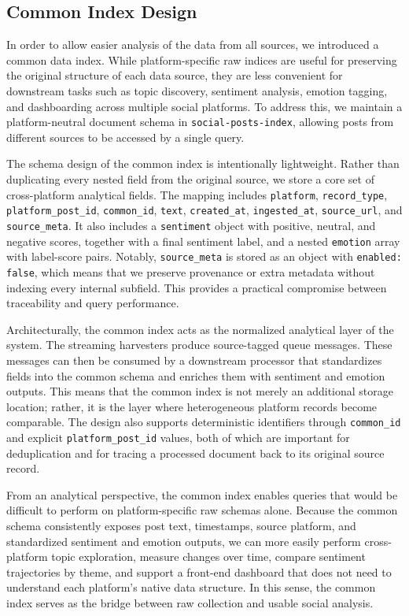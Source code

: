 \subsection{Common Index Design}
\label{DataProcessingCommonIndexDesign}
In order to allow easier analysis of the data from all sources, we introduced a common data index. While platform-specific raw indices are useful for preserving the original structure of each data source, they are less convenient for downstream tasks such as topic discovery, sentiment analysis, emotion tagging, and dashboarding across multiple social platforms. To address this, we maintain a platform-neutral document schema in \texttt{social-posts-index}, allowing posts from different sources to be accessed by a single query.

The schema design of the common index is intentionally lightweight. Rather than duplicating every nested field from the original source, we store a core set of cross-platform analytical fields. The mapping includes \texttt{platform}, \texttt{record\_type}, \texttt{platform\_post\_id}, \texttt{common\_id}, \texttt{text}, \texttt{created\_at}, \texttt{ingested\_at}, \texttt{source\_url}, and \texttt{source\_meta}. It also includes a \texttt{sentiment} object with positive, neutral, and negative scores, together with a final sentiment label, and a nested \texttt{emotion} array with label-score pairs. Notably, \texttt{source\_meta} is stored as an object with \texttt{enabled: false}, which means that we preserve provenance or extra metadata without indexing every internal subfield. This provides a practical compromise between traceability and query performance.

Architecturally, the common index acts as the normalized analytical layer of the system. The streaming harvesters produce source-tagged queue messages. These messages can then be consumed by a downstream processor that standardizes fields into the common schema and enriches them with sentiment and emotion outputs. This means that the common index is not merely an additional storage location; rather, it is the layer where heterogeneous platform records become comparable. The design also supports deterministic identifiers through \texttt{common\_id} and explicit \texttt{platform\_post\_id} values, both of which are important for deduplication and for tracing a processed document back to its original source record.

From an analytical perspective, the common index enables queries that would be difficult to perform on platform-specific raw schemas alone. Because the common schema consistently exposes post text, timestamps, source platform, and standardized sentiment and emotion outputs, we can more easily perform cross-platform topic exploration, measure changes over time, compare sentiment trajectories by theme, and support a front-end dashboard that does not need to understand each platform's native data structure. In this sense, the common index serves as the bridge between raw collection and usable social analysis.

